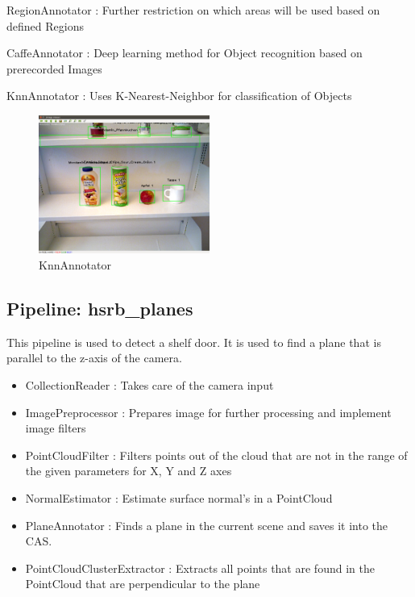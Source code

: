 \documentclass[main.tex]{subfiles}
\begin{document}
\begin{itemize}
	\item RegionAnnotator : Further restriction on which areas will be used based on defined Regions 
	\item CaffeAnnotator : Deep learning method for Object recognition based on prerecorded Images 

	\begin{minipage}[t]{\textwidth}
	\item KnnAnnotator : Uses K-Nearest-Neighbor for classification of Objects 
		\begin{figure}[H]
   			 \centering
    			 \includegraphics[width=0.5\textwidth]{pictures/2d/KnnAnnotator.png}
   			 \caption{KnnAnnotator}
  		\end{figure}
	\end{minipage}
\end{itemize}



			\subsection{Pipeline: hsrb\_planes} 
This pipeline is used to detect a shelf door. It is used to find a plane that is parallel to the z-axis of the camera.
\begin{itemize}
	\item CollectionReader : Takes care of the camera input
	\item ImagePreprocessor : Prepares image for further processing and implement image filters  
	\item PointCloudFilter : Filters points out of the cloud that are not in the range of the given parameters for X, Y and Z axes
	\item NormalEstimator : Estimate surface normal's in a PointCloud 
	\item PlaneAnnotator : Finds a plane in the current scene and saves it into the CAS.
	\item PointCloudClusterExtractor : Extracts all points that are found in the PointCloud that are perpendicular to the plane 
\end{itemize}
\end{document}
